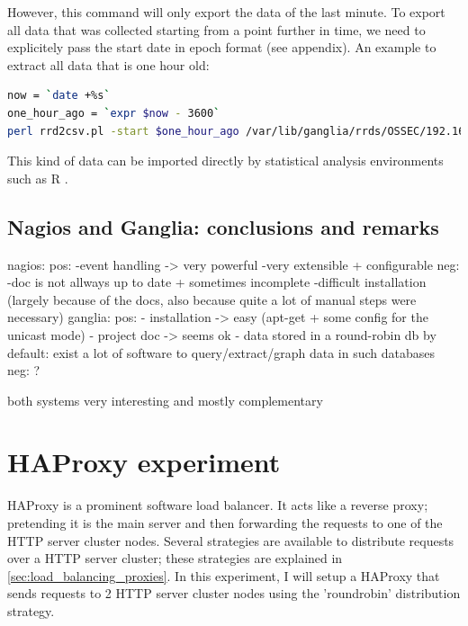 \documentclass[12pt]{report}
\begin{document}
However, this command will only export the data of the last minute. To
export all data that was collected starting from a point further in time, we need to
explicitely pass the start date in epoch format (see appendix).
An example to extract all data that is one hour old:
\begin{lstlisting}[language=bash]
now = `date +%s`
one_hour_ago = `expr $now - 3600` 
perl rrd2csv.pl -start $one_hour_ago /var/lib/ganglia/rrds/OSSEC/192.168.15.4/cpu\_user.rrd > node1_cpu_user.csv
\end{lstlisting} 

This kind of data can be imported directly by statistical analysis
environments such as R \cite{r_software}.

\subsection{Nagios and Ganglia: conclusions and remarks}
nagios:
pos: 
-event handling -> very powerful
-very extensible + configurable
neg:
-doc is not allways up to date + sometimes incomplete
-difficult installation (largely because of the docs, also because
quite a lot of manual steps were necessary)
ganglia:
pos:
- installation -> easy (apt-get + some config for the unicast mode)
- project doc -> seems ok
- data stored in a round-robin db by default: exist a lot of software
to query/extract/graph data in such databases
neg:
?

both systems very interesting and mostly complementary

\section{HAProxy experiment}
\label{ha_proxy_experiment}
HAProxy is a prominent software load balancer. It acts like a reverse
proxy; pretending it is the main server and then forwarding the
requests to one of the HTTP server cluster nodes.
Several strategies are available to distribute requests over a HTTP
server cluster; these strategies are explained in
\ref{sec:load_balancing_proxies}.
In this experiment, I will setup a HAProxy that sends requests to 2
HTTP server cluster nodes using the 'roundrobin' distribution
strategy.
\end{document}

